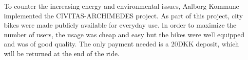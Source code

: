 To counter the increasing energy and environmental issues, Aalborg Kommune implemented the CIVITAS-ARCHIMEDES project\cite{aalborgbycyklenbagcyklen}. As part of this project, city bikes were made publicly available for everyday use.
In order to maximize the number of users, the usage was cheap and easy but the bikes were well equipped and was of good quality\cite{cykelplanlaegning}. The only payment needed is a 20DKK deposit, which will be returned at the end of the ride.

